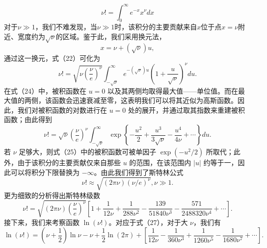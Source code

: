 \begin{equation}\tag{17.2.23}\label{eq:17.2.23}
\nu ! = \int _ { 0 } ^{\infty} e ^{- x} x ^{\nu} d x
\end{equation}
对于\(\nu \gg 1\)，我们不难发现，当\(\nu \gg 1\)时，该积分的主要贡献来自\(x\)位于点\(x = \nu\)附近、宽度约为\(\sqrt{\nu}\)的区域。鉴于此，我们采用换元法，
\begin{equation}\tag{17.2.24}\label{eq:17.2.24}
x = \nu + ( \sqrt { \nu } ) u ,
\end{equation}
通过这一换元，式（22）可化为
\begin{equation}\tag{17.2.25}\label{eq:17.2.25}
\nu ! = \sqrt { \nu \left( \frac { \nu } { e } \right) ^{\nu} } \int _ { - \sqrt { \nu } } ^{\infty} e ^{- ( \sqrt { \nu} ) u } \left( 1 + \frac { u } { \sqrt { \nu } } \right) ^{\nu} d u .
\end{equation}
在式（24）中，被积函数在 \(u=0\) 以及其两侧均取得最大值——单位值。而在最大值的两侧，该函数会迅速衰减至零，这表明我们可以将其近似为高斯函数。因此，我们对被积函数的对数进行在 \(u=0\) 处的展开，并通过取其指数来重建被积函数；由此得到
\begin{equation}\tag{17.2.26}\label{eq:17.2.26}
\nu ! = \sqrt { \nu } \left( \frac { \nu } { e } \right) ^{\nu} \int _ { - \sqrt { \nu } } ^{\infty} \exp \left\{ - \frac { u ^{2} } { 2 } + \frac { u ^{3} } { 3 \sqrt { \nu } } - \frac { u ^{4} } { 4 \nu } + \cdots \right\} d u .
\end{equation}
若 \(\nu\) 足够大，则式（25）中的被积函数可被单因子 \(\exp(-u^2/2)\) 所取代；此外，由于该积分的主要贡献仅来自那些 \(u\) 的范围，在该范围内 \(|u|\) 约等于一，因此可以将积分下限替换为 \(-\infty\)。由此我们得到了斯特林公式
\begin{equation}\tag{17.2.27}\label{eq:17.2.27}
\nu ! \approx \sqrt { ( 2 \pi \nu ) ( \nu / e ) ^{\nu} } ,  \nu \gg 1 .
\end{equation}
更为细致的分析得出斯特林级数
\begin{equation}\tag{17.2.28}\label{eq:17.2.28}
\nu ! = \sqrt { ( 2 \pi \nu ) \left( \frac { \nu } { e } \right) ^{\nu} } \left[ 1 + \frac { 1 } { 12 \nu } + \frac { 1 } { 28 8 \nu ^{2} } - \frac { 13 9 } { 51 84 0 \nu ^{3} } - \frac { 57 1 } { 24 88 32 0 \nu ^{4} } + \cdots \right] .
\end{equation}
接下来，我们来考察函数 \(\ln(\nu!)\)。对应于式（27），对于大 \(\nu\)，我们有
\begin{equation}\tag{17.2.29}\label{eq:17.2.29}
\ln \left( \nu ! \right) = \left( \nu + \frac { 1 } { 2 } \right) \ln \nu - \nu + \frac { 1 } { 2 } \ln \left( 2 \pi \right) + \left[ \frac { 1 } { 12 \nu } - \frac { 1 } { 36 0 \nu ^{3} } + \frac { 1 } { 12 60 \nu ^{5} } - \frac { 1 } { 16 80 \nu ^{7} } + \cdots \right] .
\end{equation}
